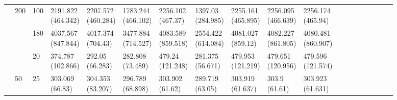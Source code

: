 \documentclass[12pt,a4paper]{article}
\begin{document}
\begin{landscape}
\begin{longtable}{lllllllllllrrrrrrrr}
\cline{2-19}
 & \multirow[t]{3}{*}{200} & 100 & \makecell{2191.822 \\ (464.342)} & \makecell{2207.572 \\ (460.284)} & \makecell{1783.244 \\ (466.102)} & \makecell{2256.102 \\ (467.37)} & \makecell{1397.03 \\ (284.985)} & \makecell{2255.161 \\ (465.895)} & \makecell{2256.095 \\ (466.639)} & \makecell{2256.174 \\ (465.94)} \\
 &  & 180 & \makecell{4037.567 \\ (847.844)} & \makecell{4017.374 \\ (704.43)} & \makecell{3477.884 \\ (714.527)} & \makecell{4083.589 \\ (859.518)} & \makecell{2554.422 \\ (614.084)} & \makecell{4081.027 \\ (859.12)} & \makecell{4082.227 \\ (861.805)} & \makecell{4080.481 \\ (860.907)} \\
 &  & 20 & \makecell{374.787 \\ (102.866)} & \makecell{292.05 \\ (66.283)} & \makecell{282.808 \\ (73.489)} & \makecell{479.24 \\ (121.248)} & \makecell{281.375 \\ (56.671)} & \makecell{479.953 \\ (121.219)} & \makecell{479.651 \\ (120.956)} & \makecell{479.596 \\ (121.574)} & \\
\cline{2-19}
 & \multirow[t]{3}{*}{50} & 25 & \makecell{303.069 \\ (66.83)} & \makecell{304.353 \\ (83.207)} & \makecell{296.789 \\ (68.898)} & \makecell{303.902 \\ (61.62)} & \makecell{289.719 \\ (63.05)} & \makecell{303.919 \\ (61.637)} & \makecell{303.9 \\ (61.61)} & \makecell{303.923 \\ (61.631)} \\

\end{longtable}
\end{landscape}
\end{document}
